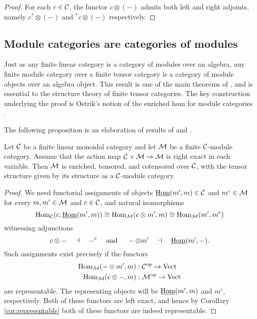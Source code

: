 \documentclass{amsart}
\begin{document}
\begin{proof}
	For each $c \in \mathcal C$, the functor $c \otimes (-)$ admits both left and right adjoints, namely $c^* \otimes (-)$ and ${}^*c \otimes (-)$ respectively. 
\end{proof}



\subsection{Module categories are categories of modules}


Just as any finite linear category is a category of modules over an algebra, any finite module category over a finite tensor category is a category of module objects over an algebra object.  This result is one of the main theorems of \cite{EGNO}, and is essential to the structure theory of finite tensor categories.  The key construction underlying the proof is Ostrik's notion of the enriched hom for module categories \cite{MR1976459}.  

The following proposition is an elaboration of results of \cite{MR1976459} and \cite{EO-ftc}. %
\begin{proposition} \label{thm:enrichment-of-mod-cats}
	Let $\mathcal C$ be a finite linear monoidal category and let $\mathcal M$ be a finite $\mathcal C$-module category. Assume that the action map $\mathcal C \times \mathcal M \to \mathcal M$ is right exact in each variable. 
		Then $\mathcal M$ is enriched, tensored, and cotensored over $\mathcal C$, with the tensor structure given by its structure as a $\mathcal C$-module category. 
\end{proposition}

\begin{proof}
	We need functorial assignments of objects $\operatorname{\underline{Hom}}(m', m) \in \mathcal C$ and $m^c \in \mathcal M$ for every $m,m' \in \mathcal M$ and $c \in \mathcal C$, and natural isomorphisms
	\begin{equation*}
		\operatorname{Hom}_\mathcal C(c, \operatorname{\underline{Hom}}(m', m)) \cong \operatorname{Hom}_\mathcal M(c \otimes m', m) \cong \operatorname{Hom}_\mathcal M( m', m^c)
	\end{equation*}
	witnessing adjunctions
	\begin{equation*}
			c \otimes - \quad \dashv\quad -^c \quad \textrm{ and } \quad - \otimes m' \quad \dashv \quad \operatorname{\underline{Hom}}(m', -).
	\end{equation*}
Such assignments exist precisely if the functors
\begin{align*}
	\operatorname{Hom}_\mathcal M(-\otimes m', m): \; & \mathcal C^{\mathrm{op}} \to \mathrm{Vect} \\
	\operatorname{Hom}_\mathcal M(c \otimes -, m): \; & \mathcal M^{\mathrm{op}} \to \mathrm{Vect}
\end{align*}
are representable. The representing objects will be $\operatorname{\underline{Hom}}(m', m)$ and $m^c$, respectively. Both of these functors are left exact, and hence by Corollary \ref{cor:representable} both of these functors are indeed representable.  %
\end{proof}
\end{document}
